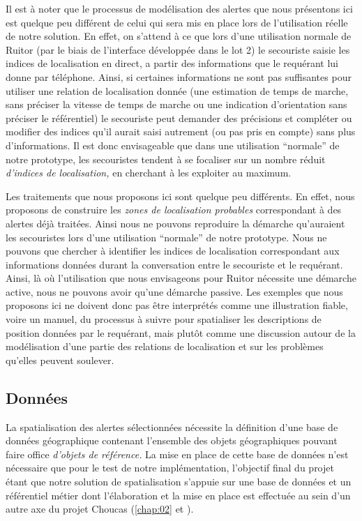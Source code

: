 Il est à noter que le processus de modélisation des alertes que nous
présentons ici est quelque peu différent de celui qui sera mis en
place lors de l'utilisation réelle de notre solution. En effet, on
s'attend à ce que lors d'une utilisation normale de Ruitor (par le
biais de l'interface développée dans le lot 2) le secouriste saisie
les indices de localisation en direct, a partir des informations que
le requérant lui donne par téléphone. Ainsi, si certaines informations
ne sont pas suffisantes pour utiliser une relation de localisation
donnée (\eg une estimation de temps de marche, sans préciser la
vitesse de temps de marche ou une indication d'orientation sans
préciser le référentiel) le secouriste peut demander des précisions et
compléter ou modifier des indices qu'il aurait saisi autrement (ou pas
pris en compte) sans plus d'informations. Il est donc envisageable que
dans une utilisation \enquote{normale} de notre prototype, les
secouristes tendent à se focaliser sur un nombre réduit
\emph{d'indices de localisation,} en cherchant à les exploiter au
maximum.

Les traitements que nous proposons ici sont quelque peu différents. En
effet, nous proposons de construire les \emph{zones de localisation
  probables} correspondant à des alertes déjà traitées. Ainsi nous ne
pouvons reproduire la démarche qu'auraient les secouristes lors d'une
utilisation \enquote{normale} de notre prototype. Nous ne pouvons que
chercher à identifier les indices de localisation correspondant aux
informations données durant la conversation entre le secouriste et le
requérant. Ainsi, là où l'utilisation que nous envisageons pour Ruitor
nécessite une démarche active, nous ne pouvons avoir qu'une démarche
passive. Les exemples que nous proposons ici ne doivent donc pas être
interprétés comme une illustration fiable, voire un manuel, du
processus à suivre pour spatialiser les descriptions de position
données par le requérant, mais plutôt comme une discussion autour de
la modélisation d'une partie des relations de localisation et sur les
problèmes qu'elles peuvent soulever.

\subsection{Données}

La spatialisation des alertes sélectionnées nécessite la définition
d'une base de données géographique contenant l'ensemble des objets
géographiques pouvant faire office \emph{d'objets de référence.} La
mise en place de cette base de données n'est nécessaire que pour le
test de notre implémentation, l'objectif final du projet étant que
notre solution de spatialisation s'appuie sur une base de données et
un référentiel métier dont l’élaboration et la mise en place est
effectuée au sein d'un autre axe du projet Choucas (\autoref{chap:02}
et \cite{VanDamme2019}).


